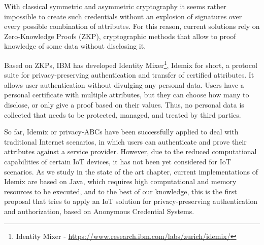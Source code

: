 With classical symmetric and asymmetric cryptography it seems rather impossible to create such credentials without an explosion of signatures over every possible combination of attributes. For this reason, current solutions rely on  Zero-Knowledge Proofs (ZKP), cryptographic methods that allow to proof knowledge of some data without disclosing it.

Based on ZKPs, IBM has developed Identity Mixer\footnote{Identity Mixer - \url{https://www.research.ibm.com/labs/zurich/idemix/}}, Idemix for short, a protocol suite for privacy-preserving authentication and transfer of certified attributes. It allows user authentication without divulging any personal data. Users have a personal certificate with multiple attributes, but they can choose how many to disclose, or only give a proof based on their values. Thus, no personal data is collected that needs to be protected, managed, and treated by third parties.


So far, Idemix or privacy-ABCs have been successfully applied to deal with traditional Internet scenarios, in which users can authenticate and prove their attributes against a service provider. However, due to the reduced computational capabilities of certain IoT devices, it has not been yet considered for IoT scenarios. As we study in the state of the art chapter, current implementations of Idemix are based on Java, which requires high computational and memory resources to be executed, and to the best of our knowledge, this is the first proposal that tries to apply an IoT solution for privacy-preserving authentication and authorization, based on Anonymous Credential Systems.







